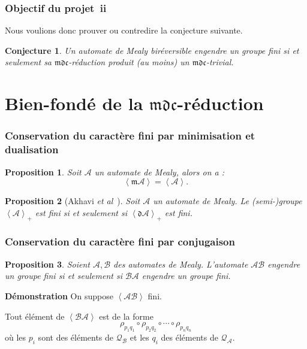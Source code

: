 \documentclass[11pt]{beamer}
\newtheorem{prop}{Proposition}
\newtheorem{conj}{Conjecture}
\begin{document}
\begin{frame}
  \frametitle{Objectif du projet~ii}

  Nous voulions donc prouver ou contredire la conjecture suivante.

  \begin{conj}
    Un automate de Mealy biréversible engendre un groupe fini si et seulement sa $\mathfrak{mdc}$-réduction produit (au moins) un $\mathfrak{mdc}$-trivial.
  \end{conj}

\end{frame}

\section{Bien-fondé de la $\mathfrak{mdc}$-réduction}

\begin{frame}
  \frametitle{Conservation du caractère fini par minimisation et dualisation}
  \begin{prop}
    Soit $\mathcal{A}$ un automate de Mealy, alors on a :
    \[ \left<\mathfrak{m}\mathcal{A}\right> = \left<\mathcal{A}\right>. \]
  \end{prop}

  \begin{prop}[Akhavi \emph{et al}~\cite{DBLP:journals/corr/abs-1105-4725}]
    Soit $\mathcal{A}$ un automate de Mealy. Le (semi-)groupe $\left<\mathcal{A}\right>_+$ est fini si et seulement si $\left<\mathfrak{d}\mathcal{A}\right>_+$ est fini.
  \end{prop}
\end{frame}

\begin{frame}
  \frametitle{Conservation du caractère fini par conjugaison}

  \begin{prop} %
    Soient $\mathcal{A}, \mathcal{B}$ des automates de Mealy.
    L'automate $\mathcal{A}\mathcal{B}$ engendre un groupe fini si et seulement si $\mathcal{B}\mathcal{A}$ engendre un groupe fini.
  \end{prop}

  \textbf{Démonstration}
  On suppose $\left<\mathcal{A}\mathcal{B}\right>$ fini.

  Tout élément de $\left<\mathcal{B}\mathcal{A}\right>$ est de la forme
  \[
    \rho_{p_1q_1}\circ\rho_{p_2q_2}\circ\cdots\circ\rho_{p_nq_n}
  \]
  où les $p_i$ sont des éléments de $\mathcal{Q}_\mathcal{B}$ et les $q_i$ des éléments de $\mathcal{Q}_\mathcal{A}$.
\end{frame}
\end{document}
